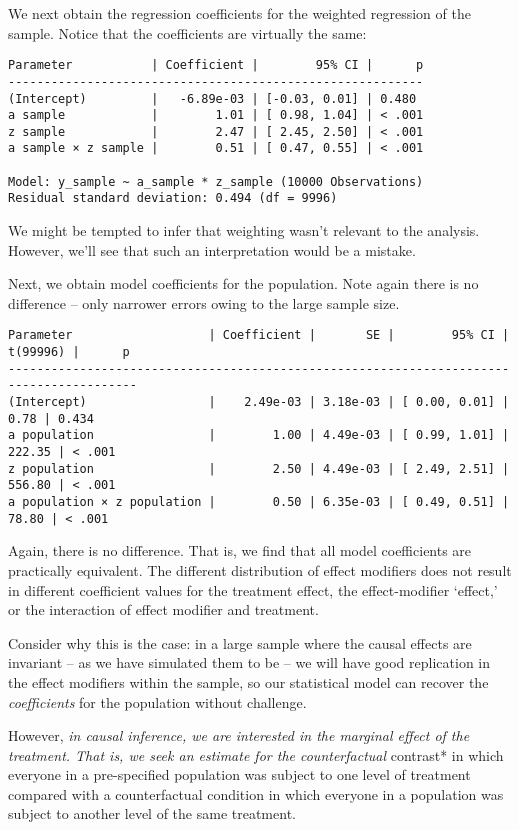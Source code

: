 \documentclass[
  single column]{article}
\begin{document}
We next obtain the regression coefficients for the weighted regression
of the sample. Notice that the coefficients are virtually the same:

\begin{verbatim}
Parameter           | Coefficient |        95% CI |      p
----------------------------------------------------------
(Intercept)         |   -6.89e-03 | [-0.03, 0.01] | 0.480 
a sample            |        1.01 | [ 0.98, 1.04] | < .001
z sample            |        2.47 | [ 2.45, 2.50] | < .001
a sample × z sample |        0.51 | [ 0.47, 0.55] | < .001

Model: y_sample ~ a_sample * z_sample (10000 Observations)
Residual standard deviation: 0.494 (df = 9996)
\end{verbatim}

We might be tempted to infer that weighting wasn't relevant to the
analysis. However, we'll see that such an interpretation would be a
mistake.

Next, we obtain model coefficients for the population. Note again there
is no difference -- only narrower errors owing to the large sample size.

\begin{verbatim}
Parameter                   | Coefficient |       SE |        95% CI | t(99996) |      p
----------------------------------------------------------------------------------------
(Intercept)                 |    2.49e-03 | 3.18e-03 | [ 0.00, 0.01] |     0.78 | 0.434 
a population                |        1.00 | 4.49e-03 | [ 0.99, 1.01] |   222.35 | < .001
z population                |        2.50 | 4.49e-03 | [ 2.49, 2.51] |   556.80 | < .001
a population × z population |        0.50 | 6.35e-03 | [ 0.49, 0.51] |    78.80 | < .001
\end{verbatim}

Again, there is no difference. That is, we find that all model
coefficients are practically equivalent. The different distribution of
effect modifiers does not result in different coefficient values for the
treatment effect, the effect-modifier `effect,' or the interaction of
effect modifier and treatment.

Consider why this is the case: in a large sample where the causal
effects are invariant -- as we have simulated them to be -- we will have
good replication in the effect modifiers within the sample, so our
statistical model can recover the \emph{coefficients} for the population
without challenge.

However, \emph{in causal inference, we are interested in the marginal
effect of the treatment. That is, we seek an estimate for the
counterfactual }contrast* in which everyone in a pre-specified
population was subject to one level of treatment compared with a
counterfactual condition in which everyone in a population was subject
to another level of the same treatment.
\end{document}
